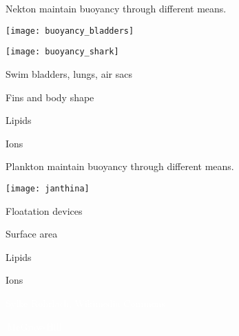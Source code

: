 \documentclass[t]{beamer}
\begin{document}
\begin{frame}[t]{Nekton maintain buoyancy through different means.}
	\begin{multicols}{2}

		\texttt{[image: buoyancy\_bladders]}

		\vspace*{2\baselineskip}
		
		\texttt{[image: buoyancy\_shark]}

	\columnbreak
	
		\hangpara Swim bladders, lungs, air sacs
		
		\hangpara Fins and body shape
		
		\hangpara Lipids
		
		\hangpara Ions

	\end{multicols}

\end{frame}

\begin{frame}[t]{Plankton maintain buoyancy through different means.}
	\begin{multicols}{2}

		\texttt{[image: janthina]}

		

	\columnbreak
	
		\hangpara Floatation devices
		
		\hangpara Surface area
		
		\hangpara Lipids
		
		\hangpara Ions

	\end{multicols}

\end{frame}

{
\begin{frame}[b]
\hfill\tiny\textcolor{white}{Sylke Rohrlach, Wikimedia Commons}
\end{frame}
}

{
\begin{frame}[b]
\tiny\textcolor{white}{\textcopyright\,McGraw-Hill}
\end{frame}
}
\end{document}

